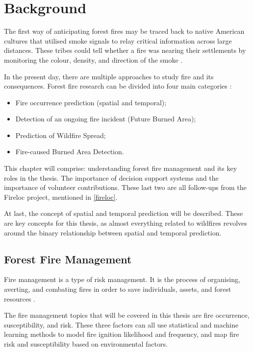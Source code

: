 \chapter{Background}
\label{sec:background}

The first way of anticipating forest fires may be traced back to native American cultures that utilised smoke signals to relay critical information across large distances. These tribes could tell whether a fire was nearing their settlements by monitoring the colour, density, and direction of the smoke \cite{Frackiewicz2023}. 

In the present day, there are multiple approaches to study fire and its consequences. Forest fire research can be divided into four main categories \cite{arif2021role}: 
\begin{itemize}
    \item Fire occurrence prediction (spatial and temporal);
    \item Detection of an ongoing fire incident (Future Burned Area);
    \item Prediction of Wildfire Spread;
    \item Fire-caused Burned Area Detection.
\end{itemize}


This chapter will comprise: understanding forest fire management and its key roles in the thesis. The importance of decision support systems and the importance of volunteer contributions. These last two are all follow-ups from the Fireloc project, mentioned in \ref{fireloc}.


At last, the concept of spatial and temporal prediction will be described. These are key concepts for this thesis, as almost everything related to wildfires revolves around the binary relationship between spatial and temporal prediction.


\section{Forest Fire Management}
Fire management is a type of risk management. It is the process of organising, averting, and combating fires in order to save individuals, assets, and forest resources \cite{Canada2023, jain2020review}.


The fire management topics that will be covered in this thesis are fire occurrence, susceptibility, and risk. These three factors can all use statistical and machine learning methods to model fire ignition likelihood and frequency, and map fire risk and susceptibility based on environmental factors.


